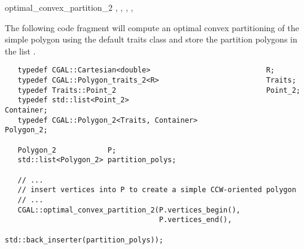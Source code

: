 \begin{ccRefFunction}{optimal_convex_partition_2}
\ccSeeAlso
{},
,
,
,


\ccExample


The following code fragment will compute an optimal
convex partitioning of the simple polygon  using the default
traits class and store the partition polygons in the list 
.

\begin{verbatim}
   typedef CGAL::Cartesian<double>                           R;
   typedef CGAL::Polygon_traits_2<R>                         Traits;
   typedef Traits::Point_2                                   Point_2;
   typedef std::list<Point_2>                                Container;
   typedef CGAL::Polygon_2<Traits, Container>                Polygon_2;

   Polygon_2            P;
   std::list<Polygon_2> partition_polys;

   // ...
   // insert vertices into P to create a simple CCW-oriented polygon
   // ...
   CGAL::optimal_convex_partition_2(P.vertices_begin(),
                                    P.vertices_end(),
                                    std::back_inserter(partition_polys));
\end{verbatim}


\end{ccRefFunction}
